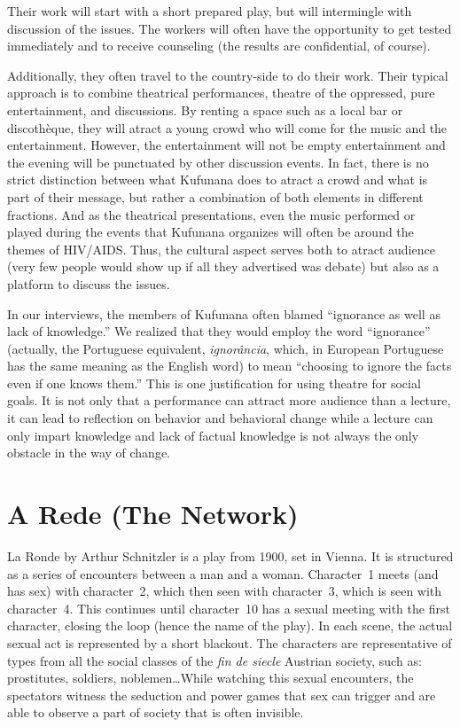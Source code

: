 \documentclass[article,twocolumn]{memoir}
\begin{document}
Their work will start with a short prepared play, but will intermingle with
discussion of the issues. The workers will often have the opportunity to get
tested immediately and to receive counseling (the results are confidential, of
course).

Additionally, they often travel to the country-side to do their work. Their
typical approach is to combine theatrical performances, theatre of the
oppressed, pure entertainment, and discussions. By renting a space such
as a local bar or discothèque, they will atract a young crowd who will come for
the music and the entertainment. However, the entertainment will not be empty
entertainment and the evening will be punctuated by other discussion events. In
fact, there is no strict distinction between what Kufunana does to atract a
crowd and what is part of their message, but rather a combination of both
elements in different fractions. And as the theatrical presentations, even the
music performed or played during the events that Kufunana organizes will often
be around the themes of HIV/AIDS. Thus, the cultural aspect serves both to
atract audience (very few people would show up if all they advertised was
debate) but also as a platform to discuss the issues. 

In our interviews, the members of Kufunana often blamed ``ignorance as well as
lack of knowledge.'' We realized that they would employ the word ``ignorance''
(actually, the Portuguese equivalent, \textit{ignor\^{a}ncia}, which, in
European Portuguese has the same meaning as the English word) to mean
``choosing to ignore the facts even if one knows them.'' This is one
justification for using theatre for social goals. It is not only that a
performance can attract more audience than a lecture, it can lead to reflection
on behavior and behavioral change while a lecture can only impart knowledge and
lack of factual knowledge is not always the only obstacle in the way of change.

\chapter{A Rede (The Network)}
La Ronde by Arthur Schnitzler is a play from 1900, set in Vienna. It is
structured as a series of encounters between a man and a woman. Character~1
meets (and has sex) with character~2, which then seen with character~3, which
is seen with character~4. This continues until character~10 has a sexual
meeting with the first character, closing the loop (hence the name of the
play). In each scene, the actual sexual act is represented by a short blackout.
The characters are representative of types from all the social classes of the
\textit{fin de siecle} Austrian society, such as: prostitutes, soldiers,
noblemen\ldots While watching this sexual encounters, the spectators witness
the seduction and power games that sex can trigger and are able to observe a
part of society that is often invisible.
\end{document}
